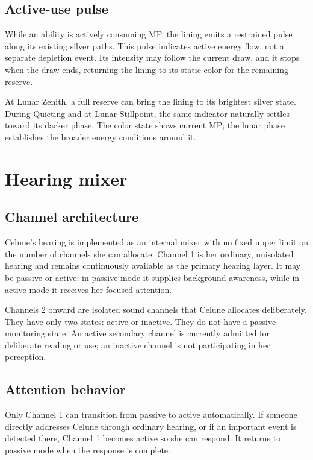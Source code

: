 \documentclass[10pt]{article}
\begin{document}
\subsection*{Active-use pulse}

While an ability is actively consuming MP, the lining emits a restrained pulse along its existing silver paths. This pulse indicates active energy flow, not a separate depletion event. Its intensity may follow the current draw, and it stops when the draw ends, returning the lining to its static color for the remaining reserve.

At Lunar Zenith, a full reserve can bring the lining to its brightest silver state. During Quieting and at Lunar Stillpoint, the same indicator naturally settles toward its darker phase. The color state shows current MP; the lunar phase establishes the broader energy conditions around it.

\clearpage

\par{}\leftskip 0pt\rightskip 0pt

\section*{Hearing mixer}
\subsection*{Channel architecture}

Celune's hearing is implemented as an internal mixer with no fixed upper limit on the number of channels she can allocate. Channel 1 is her ordinary, unisolated hearing and remains continuously available as the primary hearing layer. It may be passive or active: in passive mode it supplies background awareness, while in active mode it receives her focused attention.

Channels 2 onward are isolated sound channels that Celune allocates deliberately. They have only two states: active or inactive. They do not have a passive monitoring state. An active secondary channel is currently admitted for deliberate reading or use; an inactive channel is not participating in her perception.

\subsection*{Attention behavior}

Only Channel 1 can transition from passive to active automatically. If someone directly addresses Celune through ordinary hearing, or if an important event is detected there, Channel 1 becomes active so she can respond. It returns to passive mode when the response is complete.
\end{document}
